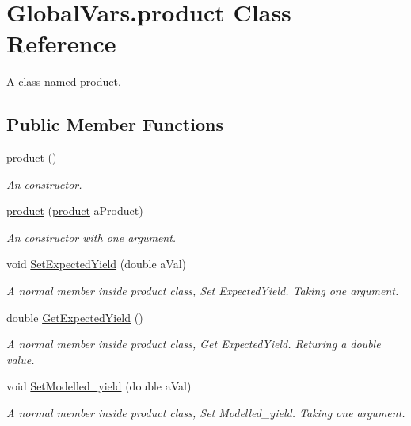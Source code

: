 \hypertarget{class_global_vars_1_1product}{}\section{Global\+Vars.\+product Class Reference}
\label{class_global_vars_1_1product}


A class named product.  


\subsection*{Public Member Functions}
\begin{DoxyCompactItemize}
\item 
\mbox{\hyperlink{class_global_vars_1_1product_a98e409001908cf1b15212222ce84c22a}{product}} ()
\begin{DoxyCompactList}\small\item\em An constructor. \end{DoxyCompactList}\item 
\mbox{\hyperlink{class_global_vars_1_1product_aea0a467580d4e1dbc977f42140334605}{product}} (\mbox{\hyperlink{class_global_vars_1_1product}{product}} a\+Product)
\begin{DoxyCompactList}\small\item\em An constructor with one argument. \end{DoxyCompactList}\item 
void \mbox{\hyperlink{class_global_vars_1_1product_ac7eacd118e8a93c7423d551e7489109d}{Set\+Expected\+Yield}} (double a\+Val)
\begin{DoxyCompactList}\small\item\em A normal member inside product class, Set Expected\+Yield. Taking one argument. \end{DoxyCompactList}\item 
double \mbox{\hyperlink{class_global_vars_1_1product_a6ee6e77e2269f3287020cb39a5781f6e}{Get\+Expected\+Yield}} ()
\begin{DoxyCompactList}\small\item\em A normal member inside product class, Get Expected\+Yield. Returing a double value. \end{DoxyCompactList}\item 
void \mbox{\hyperlink{class_global_vars_1_1product_a717c1a27b094cb7b905c6093c4006a2c}{Set\+Modelled\+\_\+yield}} (double a\+Val)
\begin{DoxyCompactList}\small\item\em A normal member inside product class, Set Modelled\+\_\+yield. Taking one argument. \end{DoxyCompactList}\item 

\end{DoxyCompactItemize}
